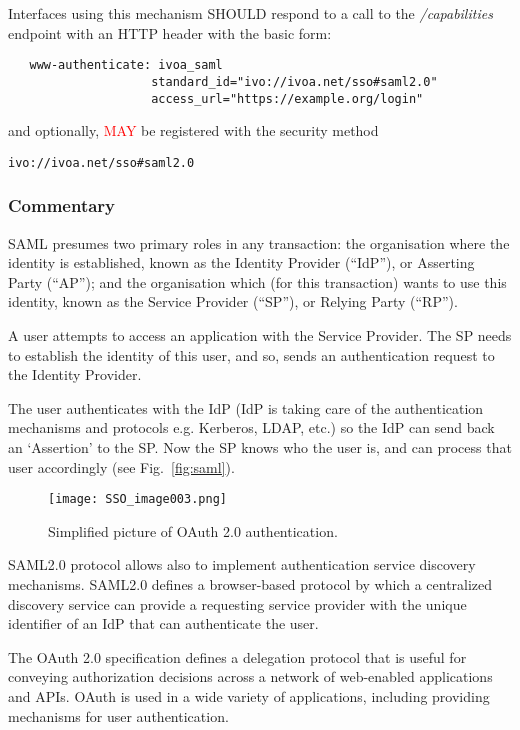 \documentclass[11pt,a4paper]{ivoa}
\begin{document}
Interfaces using this mechanism SHOULD respond to a call to the
\emph{/capabilities} endpoint with an HTTP header with the basic form:
\begin{verbatim}
   www-authenticate: ivoa_saml
                    standard_id="ivo://ivoa.net/sso#saml2.0"
                    access_url="https://example.org/login"
\end{verbatim}

\noindent and optionally, \textcolor{red}{MAY} be registered with the security
method

\texttt{ivo://ivoa.net/sso\#saml2.0}


\subsubsection{Commentary}
SAML presumes two primary roles in any transaction: the organisation
where the identity is established,
known as the Identity Provider (``IdP''), or Asserting Party (``AP'');
and the organisation which (for this transaction) wants to use this
identity, known as the Service Provider (``SP''),
or Relying Party (``RP'').

A user attempts to access an application with the Service Provider.
The SP needs to establish the identity of this user, and so, sends an
authentication request to the Identity Provider.

The user authenticates with the IdP (IdP is taking care of the
authentication mechanisms and protocols e.g. Kerberos, LDAP, etc.) so the
IdP can send back an `Assertion' to the SP.
Now the SP knows who the user is, and can process that user accordingly
(see Fig.~\ref{fig:saml}).
\begin{figure}
\centering
\texttt{[image: SSO\_image003.png]}
\caption{Simplified picture of OAuth 2.0 authentication.}
\label{fig:oauth}
\end{figure}

SAML2.0 protocol allows also to implement authentication service
discovery mechanisms. SAML2.0  defines a browser-based protocol
by which a centralized discovery service can provide a requesting
service provider with the unique identifier of an
IdP that can authenticate the user.

The OAuth 2.0 specification defines a delegation protocol that is useful
for conveying authorization decisions across a network of web-enabled
applications and APIs. OAuth is used in a wide variety of applications,
including providing mechanisms for user authentication.
\end{document}
